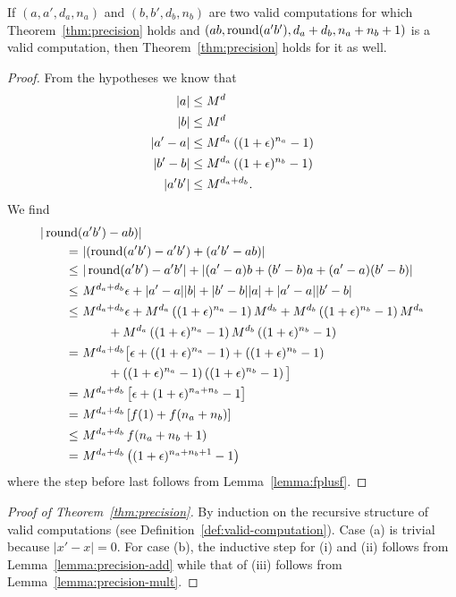 {    \begin{lemma}[multiplication]\label{lemma:precision-mult}
    If $(a,a',d_a,n_a)$ and $(b,b',d_b,n_b)$ are two valid computations for which Theorem~\ref{thm:precision} holds and $(ab,\operatorname{round}(a'b'),d_a+d_b,n_a+n_b+1)$ is a valid computation, then Theorem~\ref{thm:precision} holds for it as well.
    \end{lemma}
    \begin{proof}
    From the hypotheses we know that
    \begin{align*}
    |a| &\leq M^d\\
    |b| &\leq M^d\\
    |a'-a| &\leq M^{d_a}\left((1+\epsilon)^{n_a}-1\right)\\
    |b'-b| &\leq M^{d_a}\left((1+\epsilon)^{n_b}-1\right)\\
    |a'b'| &\leq M^{d_a+d_b}.
    \end{align*}
    We find
    \begin{align*}
    |\operatorname{round}(&a'b') - ab)|\\
    =\ &|(\operatorname{round}(a'b') - a'b') + (a'b'-ab)|\\
    \leq\ &|\operatorname{round}(a'b') - a'b'| + |(a'-a)b + (b'-b)a + (a'-a)(b'-b)|\\
    \leq\ &M^{d_a+d_b}\epsilon + |a'-a||b| + |b'-b||a| + |a'-a||b'-b|\\
    \leq\ &M^{d_a+d_b}\epsilon + M^{d_a}\left((1+\epsilon)^{n_a}-1\right)M^{d_b} + M^{d_b}\left((1+\epsilon)^{n_b}-1\right)M^{d_a}\\
    &\qquad + M^{d_a}\left((1+\epsilon)^{n_a}-1\right)M^{d_b}\left((1+\epsilon)^{n_b}-1\right)\\
    =\ &M^{d_a+d_b}\big[\epsilon + \left((1+\epsilon)^{n_a}-1\right) + \left((1+\epsilon)^{n_b}-1\right)\\
    &\qquad + \left((1+\epsilon)^{n_a}-1\right)\left((1+\epsilon)^{n_b}-1\right)\big]\\
    =\ &M^{d_a+d_b}\left[\epsilon + (1+\epsilon)^{n_a+n_b}-1\right]\\
    =\ &M^{d_a+d_b}\left[f(1) + f(n_a+n_b)\right]\\
    \leq\ &M^{d_a+d_b}\,f(n_a+n_b+1)\\
    =\ &M^{d_a+d_b}\left((1+\epsilon)^{n_a+n_b+1}-1\right)
    \end{align*}
    where the step before last follows from Lemma~\ref{lemma:fplusf}.
    \end{proof}
    
    \begin{proof}[Proof of Theorem~\ref{thm:precision}]
    By induction on the recursive structure of valid computations (see Definition~\ref{def:valid-computation}). Case (a) is trivial because $|x'-x| = 0$. For case (b), the inductive step for (i) and (ii) follows from Lemma~\ref{lemma:precision-add} while that of (iii) follows from Lemma~\ref{lemma:precision-mult}.
    \end{proof}
}
